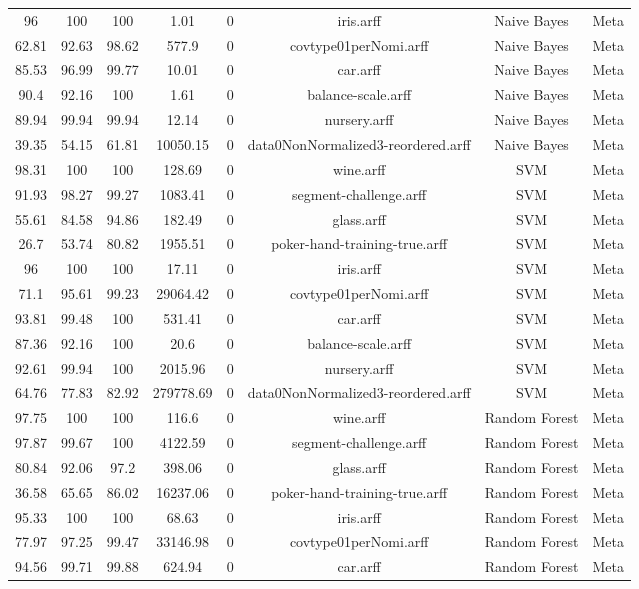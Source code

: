 \begin{longtable}{@{\extracolsep{}}cccccccc}
96	&	100	&	100	&	1.01	&	0	&	 iris.arff	&	 Naive Bayes	&	Meta	\\
62.81	&	92.63	&	98.62	&	577.9	&	0	&	 covtype01perNomi.arff	&	 Naive Bayes	&	Meta	\\
85.53	&	96.99	&	99.77	&	10.01	&	0	&	 car.arff	&	 Naive Bayes	&	Meta	\\
90.4	&	92.16	&	100	&	1.61	&	0	&	 balance-scale.arff	&	 Naive Bayes	&	Meta	\\
89.94	&	99.94	&	99.94	&	12.14	&	0	&	 nursery.arff	&	 Naive Bayes	&	Meta	\\
39.35	&	54.15	&	61.81	&	10050.15	&	0	&	 data0NonNormalized3-reordered.arff	&	 Naive Bayes	&	Meta	\\
98.31	&	100	&	100	&	128.69	&	0	&	 wine.arff	&	 SVM	&	Meta	\\
91.93	&	98.27	&	99.27	&	1083.41	&	0	&	 segment-challenge.arff	&	 SVM	&	Meta	\\
55.61	&	84.58	&	94.86	&	182.49	&	0	&	 glass.arff	&	 SVM	&	Meta	\\
26.7	&	53.74	&	80.82	&	1955.51	&	0	&	 poker-hand-training-true.arff	&	 SVM	&	Meta	\\
96	&	100	&	100	&	17.11	&	0	&	 iris.arff	&	 SVM	&	Meta	\\
71.1	&	95.61	&	99.23	&	29064.42	&	0	&	 covtype01perNomi.arff	&	 SVM	&	Meta	\\
93.81	&	99.48	&	100	&	531.41	&	0	&	 car.arff	&	 SVM	&	Meta	\\
87.36	&	92.16	&	100	&	20.6	&	0	&	 balance-scale.arff	&	 SVM	&	Meta	\\
92.61	&	99.94	&	100	&	2015.96	&	0	&	 nursery.arff	&	 SVM	&	Meta	\\
64.76	&	77.83	&	82.92	&	279778.69	&	0	&	 data0NonNormalized3-reordered.arff	&	 SVM	&	Meta	\\
97.75	&	100	&	100	&	116.6	&	0	&	 wine.arff	&	 Random Forest	&	Meta	\\
97.87	&	99.67	&	100	&	4122.59	&	0	&	 segment-challenge.arff	&	 Random Forest	&	Meta	\\
80.84	&	92.06	&	97.2	&	398.06	&	0	&	 glass.arff	&	 Random Forest	&	Meta	\\
36.58	&	65.65	&	86.02	&	16237.06	&	0	&	 poker-hand-training-true.arff	&	 Random Forest	&	Meta	\\
95.33	&	100	&	100	&	68.63	&	0	&	 iris.arff	&	 Random Forest	&	Meta	\\
77.97	&	97.25	&	99.47	&	33146.98	&	0	&	 covtype01perNomi.arff	&	 Random Forest	&	Meta	\\
94.56	&	99.71	&	99.88	&	624.94	&	0	&	 car.arff	&	 Random Forest	&	Meta	\\

\end{longtable}
